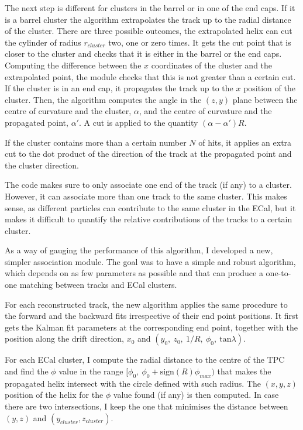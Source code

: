 The next step is different for clusters in the barrel or in one of the end caps. If it is a barrel cluster the algorithm extrapolates the track up to the radial distance of the cluster. There are three possible outcomes, the extrapolated helix can cut the cylinder of radius $r_{cluster}$ two, one or zero times. It gets the cut point that is closer to the cluster and checks that it is either in the barrel or the end caps. Computing the difference between the $x$ coordinates of the cluster and the extrapolated point, the module checks that this is not greater than a certain cut. If the cluster is in an end cap, it propagates the track up to the $x$ position of the cluster. Then, the algorithm computes the angle in the $(z,y)$ plane between the centre of curvature and the cluster, $\alpha$, and the centre of curvature and the propagated point, $\alpha'$. A cut is applied to the quantity $(\alpha-\alpha')R$.

If the cluster contains more than a certain number $N$ of hits, it applies an extra cut to the dot product of the direction of the track at the propagated point and the cluster direction.

The code makes sure to only associate one end of the track (if any) to a cluster. However, it can associate more than one track to the same cluster. This makes sense, as different particles can contribute to the same cluster in the ECal, but it makes it difficult to quantify the relative contributions of the tracks to a certain cluster.

As a way of gauging the performance of this algorithm, I developed a new, simpler association module. The goal was to have a simple and robust algorithm, which depends on as few parameters as possible and that can produce a one-to-one matching between tracks and ECal clusters.

For each reconstructed track, the new algorithm applies the same procedure to the forward and the backward fits irrespective of their end point positions. It first gets the Kalman fit parameters at the corresponding end point, together with the position along the drift direction, $x_{0}$ and $(y_{0}, \ z_{0}, \ 1/R, \ \phi_{0}, \ \mathrm{tan}\lambda)$.

For each ECal cluster, I compute the radial distance to the centre of the TPC and find the $\phi$ value in the range $[\phi_{0}, \ \phi_{0}+\mathrm{sign}(R)\phi_{max})$ that makes the propagated helix intersect with the circle defined with such radius. The $(x,y,z)$ position of the helix for the $\phi$ value found (if any) is then computed. In case there are two intersections, I keep the one that minimises the distance between $(y, z)$ and $(y_{cluster}, z_{cluster})$.


